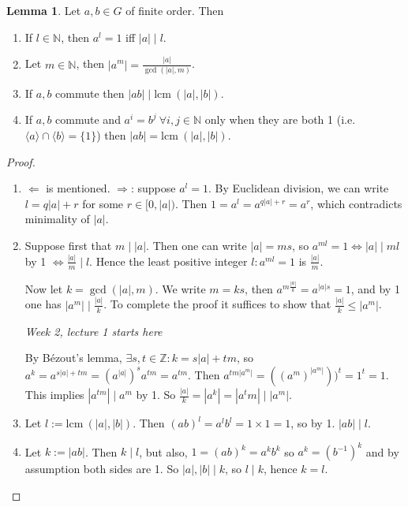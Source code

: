 \documentclass[a4paper]{article}
\newcommand{\lcm}{\text{lcm}\ }
\theoremstyle{definition}
\newtheorem{lemma}[defn]{Lemma}
\begin{document}
\begin{lemma}
\label{lemma:orderlem}
Let $a,b\in G$ of finite order. Then
\begin{enumerate}
\item If $l\in \mathbb N$, then $a^l=1$ iff $|a|\mid l$.
\item Let $m\in \mathbb N$, then $\displaystyle |a^m|=\frac{|a|}{\gcd (|a|,m)}$.
\item If $a,b$ commute then $|ab|\mid \lcm (|a|,|b|)$.
\item If $a,b$ commute and $a^i=b^j \ \forall i,j\in \mathbb N$ only when they are both 1 (i.e. $\langle a\rangle \cap \langle b\rangle =\{1\}$) then $|ab|= \lcm (|a|,|b|)$.
\end{enumerate}
\end{lemma}
\begin{proof}
\begin{enumerate}
\item $\Leftarrow$ is mentioned. $\Rightarrow$: suppose $a^l=1$. By Euclidean division, we can write $l=q|a|+r$ for some $r\in[0,|a|)$. Then $1=a^l=a^{q|a|+r}=a^r$, which contradicts minimality of $|a|$.
\item Suppose first that $m\mid |a|$. Then one can write $|a|=ms$, so $a^{ml}=1\Leftrightarrow |a| \mid ml$ by 1 $\displaystyle \Leftrightarrow \frac{|a|}{m}\mid l$. Hence the least positive integer $l:a^{ml}=1$ is $\displaystyle \frac{|a|}{m}$.

Now let $k=\gcd (|a|,m)$. We write $m=ks$, then $a^{m\frac{|a|}{k}}=a^{|a|s}=1$, and by 1 one has $|a^m| \mid \frac{|a|}{k}$. To complete the proof it suffices to show that $\frac{|a|}{k}\leq |a^m|$.
\begin{flushright}
\textit{Week 2, lecture 1 starts here}
\end{flushright}
By Bézout's lemma, $\exists s,t\in\mathbb Z:k=s|a|+tm$, so $a^k=a^{s|a|+tm}=(a^{|a|})^s a^{tm}=a^{tm}$. Then $a^{tm|a^m|}=((a^m)^{|a^m|}))^t=1^t=1$. This implies $|a^{tm}|\mid a^m$ by 1. So $\frac{|a|}{k}=|a^k|=|a^tm|\mid |a^m|$.
\item Let $l:=\lcm(|a|,|b|)$. Then $(ab)^l=a^lb^l=1\times 1=1$, so by 1. $|ab|\mid l$.
\item Let $k:=|ab|$. Then $k\mid l$, but also, $1=(ab)^k=a^kb^k$ so $a^k=\left(b^{-1}\right)^k$ and by assumption both sides are 1. So $|a|,|b|\mid k$, so $l\mid k$, hence $k=l$.
\end{enumerate}
\end{proof}
\end{document}
